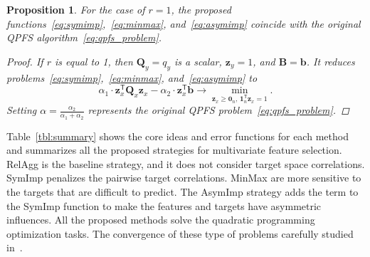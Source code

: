 \documentclass[preprint,authoryear,12pt]{elsarticle}
\newtheorem{proposition}{Proposition}
\theoremstyle{definition}
\newcommand{\bz}{\mathbf{z}}
\newcommand{\bb}{\mathbf{b}}
\newcommand{\bB}{\mathbf{B}}
\newcommand{\bQ}{\mathbf{Q}}
\newcommand{\T}{\mathsf{T}}
\newcommand{\bOne}{\boldsymbol{1}}
\newcommand{\bZero}{\boldsymbol{0}}
\begin{document}
\begin{proposition}
	For the case of $r=1$, the proposed functions~\eqref{eq:symimp},~\eqref{eq:minmax}, and~\eqref{eq:asymimp} coincide with the original QPFS algorithm~\eqref{eq:qpfs_problem}.
	
	\begin{proof}
		If $r$ is equal to 1, then $\bQ_y = q_y$ is a scalar, $\bz_y = 1$, and $\bB = \bb$. It reduces problems~\eqref{eq:symimp},~\eqref{eq:minmax}, and~\eqref{eq:asymimp} to
		\begin{equation*}
		\alpha_1 \cdot \bz_x^{\T} \bQ_x \bz_x - \alpha_2 \cdot \bz_x^{\T} \bb \rightarrow \min_{\bz_x \geq \bZero_n, \, \bOne_n^{\T}\bz_x=1} .
		\end{equation*}
		Setting $\alpha = \frac{\alpha_2}{\alpha_1 + \alpha_2}$ represents the original QPFS problem~\eqref{eq:qpfs_problem}.
	\end{proof}
\end{proposition}

Table~\ref{tbl:summary} shows the core ideas and error functions for each method and summarizes all the proposed strategies for multivariate feature selection. 
RelAgg is the baseline strategy, and it does not consider target space correlations.
SymImp penalizes the pairwise target correlations.
MinMax are more sensitive to the targets that are difficult to predict.
The AsymImp strategy adds the term to the SymImp function to make the features and targets have asymmetric influences. 
{\color{red} All the proposed methods solve the quadratic programming optimization tasks. The convergence of these type of problems carefully studied in~\citep{nesterov1983momentum,blaschke1997convergence,isachenko2018quadratic}.}
\end{document}
